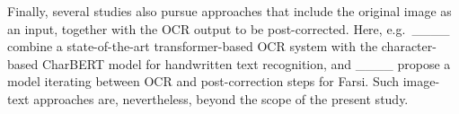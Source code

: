 Finally, several studies also pursue approaches that include the original image as an input, together with the OCR output to be post-corrected. Here, e.g.\ ____ combine a state-of-the-art transformer-based OCR system with the character-based CharBERT model for handwritten text recognition, and ____ propose a model iterating between OCR and post-correction steps for Farsi. Such image-text approaches are, nevertheless, beyond the scope of the present study.






